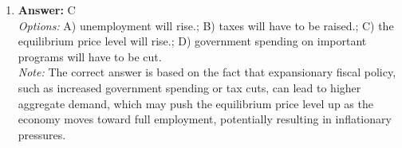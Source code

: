 \documentclass[12pt]{article}
\begin{document}
\begin{enumerate}[label=\arabic*.]
\\ \textit{Note:} The correct answer exemplifies consumer surplus because consumer surplus is defined as the difference between what a consumer is willing to pay for a good or service and what they actually pay; in this case, receiving a pizza for free indicates a maximum surplus since the consumer pays nothing while valuing the pizza.
\item \textbf{Answer:} C
\\ \textit{Options:} A) unemployment will rise.; B) taxes will have to be raised.; C) the equilibrium price level will rise.; D) government spending on important programs will have to be cut.
\\ \textit{Note:} The correct answer is based on the fact that expansionary fiscal policy, such as increased government spending or tax cuts, can lead to higher aggregate demand, which may push the equilibrium price level up as the economy moves toward full employment, potentially resulting in inflationary pressures.
\end{enumerate}
\end{document}
